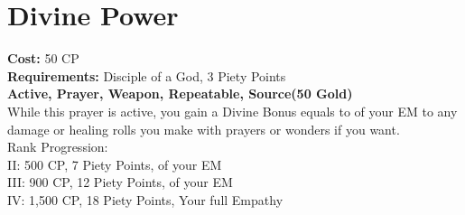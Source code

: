 \section{Divine Power}\label{prayer:divinePower}
\textbf{Cost:} 50 CP\\
\textbf{Requirements:} Disciple of a God, 3 Piety Points \\
\textbf{Active, Prayer, Weapon, Repeatable, Source(50 Gold)}\\
While this prayer is active, you gain a Divine Bonus equals to  of your EM to any damage or healing rolls you make with prayers or wonders if you want.
\\
Rank Progression:\\
II: 500 CP, 7 Piety Points,  of your EM\\
III: 900 CP, 12 Piety Points,  of your EM\\
IV: 1,500 CP, 18 Piety Points, Your full Empathy\\